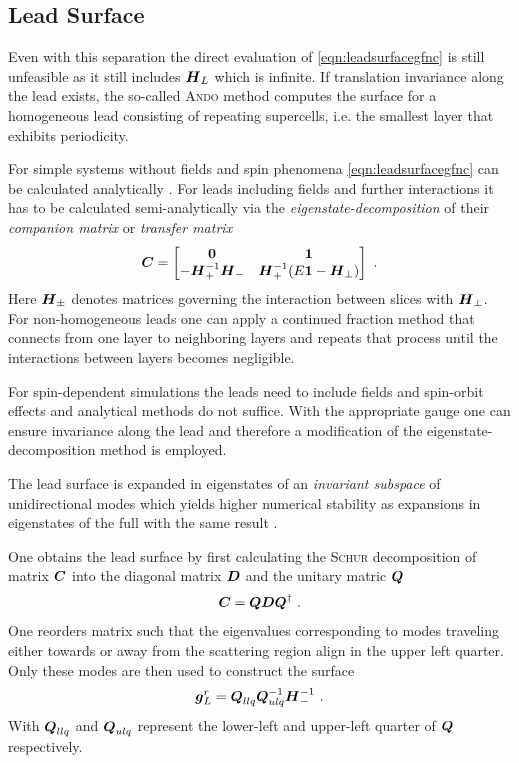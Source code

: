 \subsection{Lead Surface \cgfncs{}}
Even with this separation the direct evaluation of \cref{eqn:leadsurfacegfnc} is still unfeasible as it still includes $\boldsymbol{H}_L$ which is infinite.
If translation invariance along the lead exists, the so-called \textsc{Ando} method \cite{PhysRevB.44.8017} computes the surface \gfnc{} for a homogeneous lead consisting of repeating supercells, i.e. the smallest layer that exhibits periodicity.\par
For simple systems without fields and spin phenomena \cref{eqn:leadsurfacegfnc} can be calculated analytically \cite{Datta1997}. For leads including fields and further interactions it has to be calculated semi-analytically via the \emph{eigenstate-decomposition} of their \emph{companion matrix} \cite{PhysRevB.25.3975} or \emph{transfer matrix} \cite{PhysRevB.55.5266} \cite{PhysRevB.66.205319}
\begin{align}
  \boldsymbol{C} =
  \begin{bmatrix}
  \boldsymbol{0}  &\boldsymbol{1} \\
  -\boldsymbol{H}_{+}^{-1}\boldsymbol{H}_{-} &\boldsymbol{H}_{+}^{-1} (E\boldsymbol{1} - \boldsymbol{H}_{\perp})
  \end{bmatrix}\ .
  \label{eqn:companionmatrix}
\end{align}
Here $\boldsymbol{H}_{\pm}$ denotes matrices governing the interaction between slices with \hamil{} $\boldsymbol{H}_{\perp}$.
For non-homogeneous leads one can apply a continued fraction method \cite{Velev2004} that connects \gfncs{} from one layer to neighboring layers and repeats that process until the interactions between layers becomes negligible.\par
For spin-dependent simulations the leads need to include fields and spin-orbit effects and analytical methods do not suffice. With the appropriate gauge one can ensure invariance along the lead and therefore a modification of the eigenstate-decomposition method is employed.\par
The lead surface \gfnc{} is expanded in eigenstates of an \emph{invariant subspace} of unidirectional modes which yields higher numerical stability as expansions in eigenstates of the full \hamil{} with the same result \cite{Wimmer2009JComPhys}.\par
One obtains the lead surface \gfnc{} by first calculating the \textsc{Schur} decomposition of matrix $\boldsymbol{C}$ into the diagonal matrix $\boldsymbol{D}$ and the unitary matric $\boldsymbol{Q}$
\begin{align}
\boldsymbol{C} = \boldsymbol{Q}\boldsymbol{D}\boldsymbol{Q}^{\dagger}\ .
\label{eqn:schurdecomposition}
\end{align}
One reorders matrix  such that the eigenvalues corresponding to modes traveling either towards or away from the scattering region align in the upper left quarter. Only these modes are then used to construct the surface \gfnc{}
\begin{align}
\boldsymbol{g}^r_L = \boldsymbol{Q}_{llq}\boldsymbol{Q}_{ulq}^{-1}\boldsymbol{H}_{-}^{-1}\ .
\end{align}
With $\boldsymbol{Q}_{llq}$ and $\boldsymbol{Q}_{ulq}$ represent the lower-left and upper-left quarter of $\boldsymbol{Q}$ respectively. 
